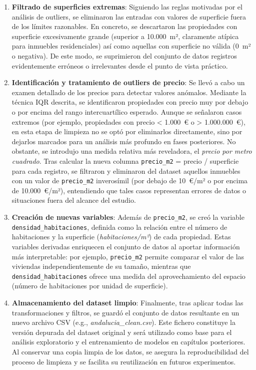 \documentclass[a4paper,11pt]{book}
\begin{document}
\begin{enumerate}
\item \textbf{Filtrado de superficies extremas}: Siguiendo las reglas motivadas por el análisis de outliers, se eliminaron las entradas con valores de superficie fuera de los límites razonables. En concreto, se descartaron las propiedades con superficie excesivamente grande (superior a 10.000 m², claramente atípica para inmuebles residenciales) así como aquellas con superficie no válida (0 m² o negativa). De este modo, se suprimieron del conjunto de datos registros evidentemente erróneos o irrelevantes desde el punto de vista práctico.

\item \textbf{Identificación y tratamiento de outliers de precio}: Se llevó a cabo un examen detallado de los precios para detectar valores anómalos. Mediante la técnica IQR descrita, se identificaron propiedades con precio muy por debajo o por encima del rango intercuartílico esperado. Aunque se señalaron casos extremos (por ejemplo, propiedades con precio < 1.000 € o > 1.000.000 €), en esta etapa de limpieza no se optó por eliminarlos directamente, sino por dejarlos marcados para un análisis más profundo en fases posteriores. No obstante, se introdujo una medida relativa más reveladora, el \emph{precio por metro cuadrado}. Tras calcular la nueva columna \texttt{precio\_m2} = precio / superficie para cada registro, se filtraron y eliminaron del dataset aquellos inmuebles con un valor de \texttt{precio\_m2} inverosímil (por debajo de 10 €/m² o por encima de 10.000 €/m²), entendiendo que tales casos representan errores de datos o situaciones fuera del alcance del estudio.

\item \textbf{Creación de nuevas variables}: Además de \texttt{precio\_m2}, se creó la variable \texttt{densidad\_habitaciones}, definida como la relación entre el número de habitaciones y la superficie (\emph{habitaciones/m²}) de cada propiedad. Estas variables derivadas enriquecen el conjunto de datos al aportar información más interpretable: por ejemplo, \texttt{precio\_m2} permite comparar el valor de las viviendas independientemente de su tamaño, mientras que \texttt{densidad\_habitaciones} ofrece una medida del aprovechamiento del espacio (número de habitaciones por unidad de superficie).

\item \textbf{Almacenamiento del dataset limpio}: Finalmente, tras aplicar todas las transformaciones y filtros, se guardó el conjunto de datos resultante en un nuevo archivo CSV (e.g., \emph{andalucia\_clean.csv}). Este fichero constituye la versión depurada del dataset original y será utilizado como base para el análisis exploratorio y el entrenamiento de modelos en capítulos posteriores. Al conservar una copia limpia de los datos, se asegura la reproducibilidad del proceso de limpieza y se facilita su reutilización en futuros experimentos.
\end{enumerate}
\end{document}
